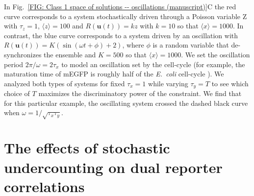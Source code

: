 \documentclass[%
 reprint,prx,
superscriptaddress,
%
%
%
%
%
%
%
%
%
 amsmath,amssymb,
 aps,
%
%
%
%
%
%
]{revtex4-2}
\begin{document}
{{{In Fig.~\ref{FIG: Class 1 space of solutions -- oscillations (manuscript)}C the red curve corresponds to a system stochastically driven through a Poisson variable Z with $\tau_{z} = 1$, $\langle z \rangle = 100$ and $R(\mathbf{u}(t)) = kz$ with $k = 10$ so that $\langle x \rangle = 1000$. In contrast, the blue curve corresponds to a system driven by an oscillation with $R(\mathbf{u}(t)) = K(\sin(\omega t + \phi) + 2)$, where $\phi$ is a random variable that de-synchronizes the ensemble and $K = 500$ so that $\langle x \rangle = 1000$. We set the oscillation period $2\pi/\omega = 2\tau_{x}$ to model an oscillation set by the cell-cycle (for example, the maturation time of mEGFP is roughly half of the \emph{E.~coli} cell-cycle \cite{Balleza2018}). We analyzed both types of systems for fixed $\tau_{x} = 1$ while varying $\tau_{y} = T$ to see which choice of $T$ maximizes the discriminatory power of the constraint. We find that for this particular example, the oscillating system crossed the dashed black curve when $\omega = 1/\sqrt{\tau_{x} \tau_{y}}$.}
%
%
%

\section{The effects of stochastic undercounting on dual reporter correlations}
\label{SEC: Undercounting}


}}
\end{document}
